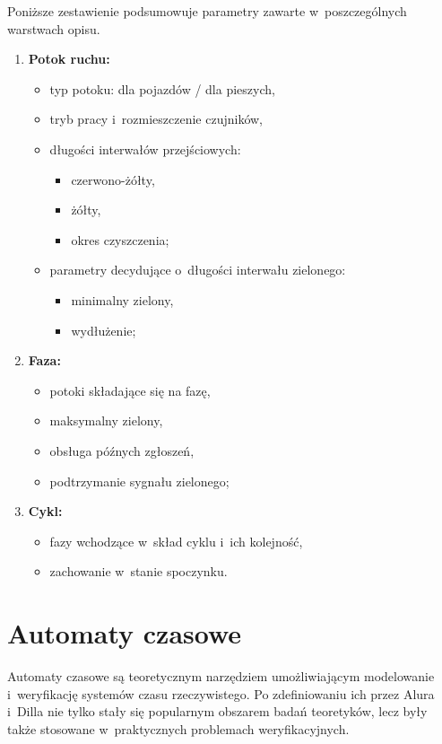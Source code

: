 \documentclass{pracamgr}
\theoremstyle{plain}
\begin{document}
Poniższe zestawienie podsumowuje parametry zawarte w~poszczególnych
warstwach opisu.
\begin{enumerate}
  \item \textbf{Potok ruchu:}
  \begin{itemize}
    \item typ potoku: dla pojazdów / dla pieszych,
    \item tryb pracy i~rozmieszczenie czujników,
    \item długości interwałów przejściowych:
    \begin{itemize}
      \item czerwono-żółty,
      \item żółty,
      \item okres czyszczenia;
    \end{itemize}
    \item parametry decydujące o~długości interwału zielonego:
    \begin{itemize}
      \item minimalny zielony,
      \item wydłużenie;
    \end{itemize}
  \end{itemize}
  \item \textbf{Faza:}
  \begin{itemize}
    \item potoki składające się na fazę,
    \item maksymalny zielony,
    \item obsługa późnych zgłoszeń,
    \item podtrzymanie sygnału zielonego;
  \end{itemize}
  \item \textbf{Cykl:}
  \begin{itemize}
    \item fazy wchodzące w~skład cyklu i~ich kolejność,
    \item zachowanie w~stanie spoczynku.
  \end{itemize}
\end{enumerate}

\chapter{Automaty czasowe}
\label{c:ta}
Automaty czasowe są teoretycznym narzędziem umożliwiającym modelowanie
i~weryfikację systemów czasu rzeczywistego. Po zdefiniowaniu ich przez
Alura i~Dilla \cite{alur-dill} nie tylko stały się popularnym obszarem
badań teoretyków, lecz były także stosowane w~praktycznych problemach
weryfikacyjnych.
\end{document}
